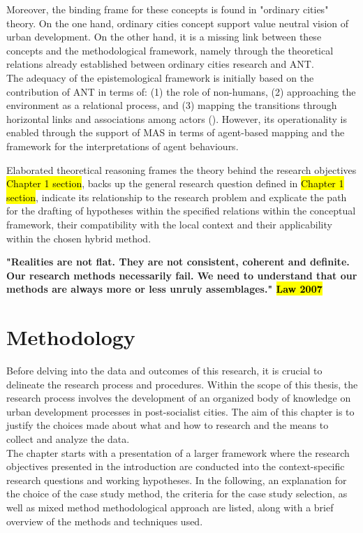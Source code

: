 \documentclass[11pt]{report}
\begin{document}
Moreover, the binding frame for these concepts is found in "ordinary cities" theory. On the one hand, ordinary cities concept support value neutral vision of urban development. On the other hand, it is a missing link between these concepts and the methodological framework, namely through the theoretical relations already established between ordinary cities research and ANT.
\\
The adequacy of the epistemological framework is initially based on the contribution of ANT in terms of:
(1) the role of non-humans, (2) approaching the environment as a relational process, and (3) mapping the transitions through horizontal links and associations among actors (\cite{Latour 2005}).
However, its operationality is enabled through the support of MAS in terms of agent-based mapping and the framework for the interpretations of agent behaviours. 

Elaborated theoretical reasoning frames the theory behind the research objectives \hl{Chapter 1 section}, backs up the general research question defined in \hl{Chapter 1 section}, indicate its relationship to the research problem and explicate the path for the drafting of hypotheses within the specified relations within the conceptual framework, their compatibility with the local context and their applicability within the chosen hybrid method.

\textbf{"Realities are not flat. They are not consistent, coherent and definite. Our research methods necessarily fail. We need to understand that our methods are always more or less unruly assemblages." \hl{Law 2007}}



\chapter{Methodology}

Before delving into the data  and outcomes of this research, it is crucial to delineate the research process and procedures. Within the scope of this thesis, the research process involves the development of an organized body of knowledge on urban development processes in post-socialist cities. The aim of this chapter is to justify the choices made about what and how to research and the means to collect and analyze the data.
\\
The chapter starts with a presentation of a larger framework where the research objectives presented in the introduction are conducted into the context-specific research questions and working hypotheses. In the following, an explanation for the choice of the case study method, the criteria for the case study selection, as well as mixed method methodological approach are listed, along with a brief overview of the methods and techniques used.  
\end{document}
